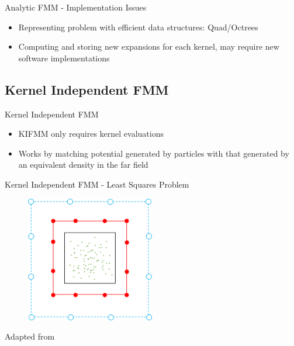 \begin{frame}{Analytic FMM - Implementation Issues}
    \begin{itemize}
        \item Representing problem with efficient data structures: Quad/Octrees
        \item Computing and storing new expansions for each kernel, may require new software implementations
    \end{itemize}
\end{frame}


\subsection{Kernel Independent FMM}
\begin{frame}{Kernel Independent FMM}
    \begin{itemize}
        \item KIFMM only requires kernel evaluations
        \item Works by matching potential generated by particles with that generated by an equivalent density in the far field
    \end{itemize}
\end{frame}

\begin{frame}{Kernel Independent FMM - Least Squares Problem}
    \begin{figure}
        \centering
        \includegraphics[width=0.5\textwidth]{assets/least_sq_multipole.png}
    \end{figure}

    Adapted from \cite{Ying:2004:JCP}

    \vspace{55pt}
\end{frame}

